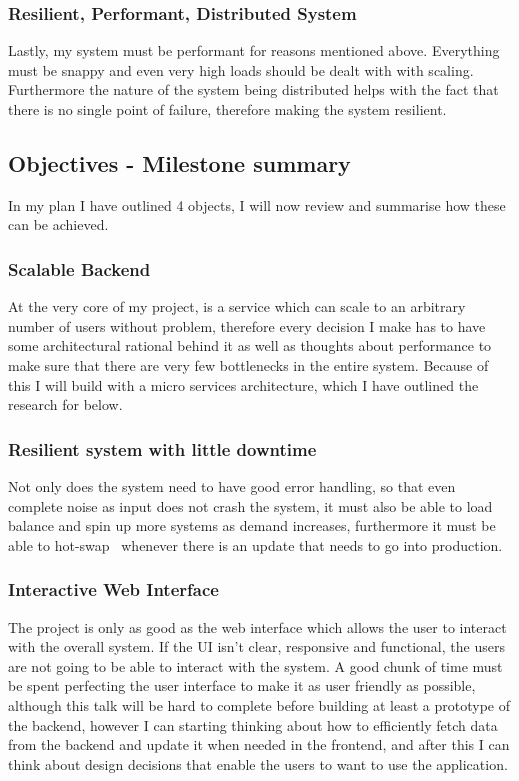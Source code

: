 \documentclass[titlepage]{article}
\begin{document}
\subsubsection{Resilient, Performant, Distributed System}
Lastly, my system must be performant for reasons mentioned above. Everything must be snappy and even very high loads should be dealt with with scaling. Furthermore the nature of the system being distributed helps with the fact that there is no single point of failure, therefore making the system resilient.

\subsection{Objectives - Milestone summary}

In my plan I have outlined 4 objects, I will now review and summarise how these can be achieved.

\subsubsection{Scalable Backend}
At the very core of my project, is a service which can scale to an arbitrary number of users without problem, therefore every decision I make has to have some architectural rational behind it as well as thoughts about performance to make sure that there are very few bottlenecks in the entire system. Because of this I will build with a micro services architecture, which I have outlined the research for below.

\subsubsection{Resilient system with little downtime}
Not only does the system need to have good error handling, so that even complete noise as input does not crash the system, it must also be able to load balance and spin up more systems as demand increases, furthermore it must be able to hot-swap~\cite{hot_swap} whenever there is an update that needs to go into production. 

\subsubsection{Interactive Web Interface}
The project is only as good as the web interface which allows the user to interact with the overall system. If the UI isn't clear, responsive and functional, the users are not going to be able to interact with the system. A good chunk of time must be spent perfecting the user interface to make it as user friendly as possible, although this talk will be hard to complete before building at least a prototype of the backend, however I can starting thinking about how to efficiently fetch data from the backend and update it when needed in the frontend, and after this I can think about design decisions that enable the users to want to use the application.
\end{document}
